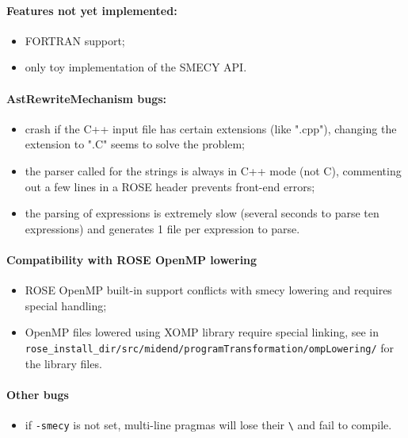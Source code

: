 \documentclass[a4paper,11pt]{article}
\begin{document}
		\paragraph{Features not yet implemented:}
		\begin{itemize}
			\item FORTRAN support;
			\item only toy implementation of the SMECY API.
		\end{itemize}

		\paragraph{AstRewriteMechanism bugs:}
		\begin{itemize}
			\item crash if the C++ input file has certain extensions (like ".cpp"), changing the extension to ".C" seems to solve the problem;
			\item the parser called for the strings is always in C++ mode (not C), commenting out a few lines in a ROSE header prevents front-end errors;
			\item the parsing of expressions is extremely slow (several seconds to parse ten expressions) and generates 1 file per expression to parse.
		\end{itemize}

		\paragraph{Compatibility with ROSE OpenMP lowering}
		\begin{itemize}
			\item ROSE OpenMP built-in support conflicts with smecy lowering and requires special handling;
			\item OpenMP files lowered using XOMP library require special linking, see in \verb+rose_install_dir/src/midend/programTransformation/ompLowering/+ for the library files.
		\end{itemize}

		\paragraph{Other bugs}
		\begin{itemize}
			\item if \verb+-smecy+ is not set, multi-line pragmas will lose their \verb+\+ and fail to compile.
		\end{itemize}

	
	
\end{document}
